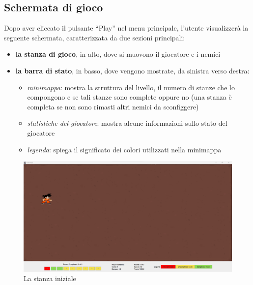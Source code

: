\documentclass[a4paper,12pt]{report}
\begin{document}
\newpage
\subsection*{Schermata di gioco}
Dopo aver cliccato il pulsante ``Play'' nel menu principale, l'utente visualizzerà la seguente schermata, caratterizzata da due sezioni principali:
\begin{itemize}
    \item \textbf{la stanza di gioco}, in alto, dove si muovono il giocatore e i nemici
    \item \textbf{la barra di stato}, in basso, dove vengono mostrate, da sinistra verso destra:
    \begin{itemize}
        \item \textit{minimappa}: mostra la struttura del livello, il numero di stanze che lo compongono e se tali stanze sono complete oppure no
        (una stanza è completa se non sono rimasti altri nemici da sconfiggere)
        \item \textit{statistiche del giocatore}: mostra alcune informazioni sullo stato del giocatore
        \item \textit{legenda}: spiega il significato dei colori utilizzati nella minimappa
    \end{itemize}
\end{itemize}

\begin{figure}[H]
\centering{}
\includegraphics[width=\textwidth]{img/emptyRoom.png}
\caption{La stanza iniziale}
\label{img/emptyRoom}
\end{figure}
\end{document}
